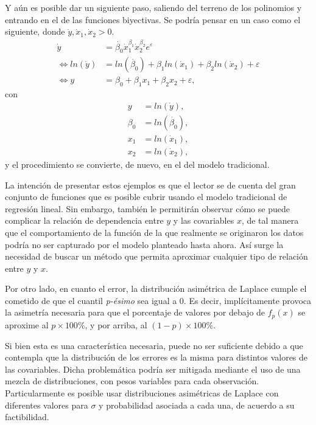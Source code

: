 Y a\'un es posible dar un siguiente paso, saliendo del terreno de los polinomios y entrando en el de las funciones biyectivas. Se podr\'ia pensar en un caso como el siguiente, donde $\dot{y},\dot{x}_1,\dot{x}_2 > 0$.
\begin{equation*}
\begin{aligned}
    \dot{y} &= \dot{\beta_0}\dot{x}_1^{\beta_1}\dot{x}_2^{\beta_2} e^{\varepsilon} \\
    \iff ln(\dot{y}) &= ln(\dot{\beta_0}) + \beta_1 ln(\dot{x}_1) + \beta_2 ln(\dot{x}_2) + \varepsilon \\
    \iff y &= \beta_0 + \beta_1 x_1 + \beta_2 x_2 + \varepsilon, 
\end{aligned}
\end{equation*}
con
\begin{equation*}
\begin{aligned}
    y &= ln(\dot{y}), \\
    \beta_0 &= ln(\dot{\beta_0}), \\
    x_1 &= ln(\dot{x}_1), \\
    x_2 &= ln(\dot{x}_2),
\end{aligned}
\end{equation*}
y el procedimiento se convierte, de nuevo, en el del modelo tradicional.

La intenci\'on de presentar estos ejemplos es que el lector se de cuenta del gran conjunto de funciones que es posible cubrir usando el modelo tradicional de regresi\'on lineal. Sin embargo, tambi\'en le permitir\'an observar c\'omo se puede complicar la relaci\'on de dependencia entre $y$ y las covariables $x$, de tal manera que el comportamiento de la funci\'on de la que realmente se originaron los datos podr\'ia no ser capturado por el modelo planteado hasta ahora. As\'i surge la necesidad de buscar un m\'etodo que permita aproximar cualquier tipo de relaci\'on entre $y$ y $x$.

Por otro lado, en cuanto el error, la distribuci\'on asim\'etrica de Laplace cumple el cometido de que el cuantil \textit{p-\'esimo} sea igual a 0. Es decir, impl\'icitamente provoca la asimetr\'ia necesaria para que el porcentaje de valores por debajo de $f_p(x)$ se aproxime al $p \times 100\%$, y por arriba, al $(1-p) \times 100\%$.

Si bien esta es una caracter\'istica necesaria, puede no ser suficiente debido a que contempla que la distribuci\'on de los errores es la misma para distintos valores de las covariables. Dicha problem\'atica podr\'ia ser mitigada mediante el uso de una mezcla de distribuciones, con pesos variables para cada observaci\'on. Particularmente es posible usar distribuciones asim\'etricas de Laplace con diferentes valores para $\sigma$ y probabilidad asociada a cada una, de acuerdo a su factibilidad. 

